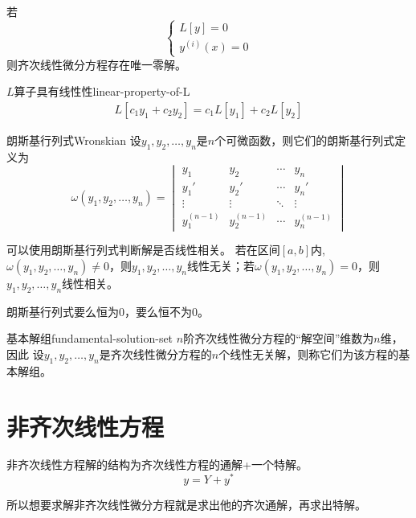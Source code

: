 \documentclass[math]{amznotes}
\begin{document}
若\begin{equation*}
  \left\{
  \begin{split}
  L[y] = 0\\
  y^{(i)}(x) = 0
  \end{split}
  \right.
\end{equation*}
则齐次线性微分方程存在唯一零解。
\begin{tecbox}{$L$算子具有线性性}{linear-property-of-L}
    \begin{eqnarray*}
      L[c_1y_1 + c_2y_2] = c_1L[y_1] + c_2L[y_2]
    \end{eqnarray*}
\end{tecbox}
\begin{dfnbox}{朗斯基行列式}{Wronskian}
    设$y_1, y_2, \ldots, y_n$是$n$个可微函数，则它们的朗斯基行列式定义为
    \begin{equation*}
        \omega(y_1, y_2, \ldots, y_n) =
        \begin{vmatrix}
            y_1 & y_2 & \cdots & y_n \\
            y_1' & y_2' & \cdots & y_n' \\
            \vdots & \vdots & \ddots & \vdots \\
            y_1^{(n-1)} & y_2^{(n-1)} & \cdots & y_n^{(n-1)}
        \end{vmatrix}
    \end{equation*}
\end{dfnbox}
可以使用朗斯基行列式判断解是否线性相关。
若在区间$[a, b]$内,$\omega(y_1, y_2, \ldots, y_n) \neq 0$，则$y_1, y_2, \ldots, y_n$线性无关；若$\omega(y_1, y_2, \ldots, y_n) = 0$，则$y_1, y_2, \ldots, y_n$线性相关。
\begin{notebox}
朗斯基行列式要么恒为0，要么恒不为0。
\end{notebox}
\begin{dfnbox}{基本解组}{fundamental-solution-set}
    $n$阶齐次线性微分方程的``解空间''维数为$n$维，因此
    设$y_1, y_2, \ldots, y_n$是齐次线性微分方程的$n$个线性无关解，则称它们为该方程的基本解组。
\end{dfnbox}
\section{非齐次线性方程}
非齐次线性方程解的结构为齐次线性方程的通解+一个特解。
\begin{equation*}
  y = Y + y^*
\end{equation*}

所以想要求解非齐次线性微分方程就是求出他的齐次通解，再求出特解。
\end{document}
